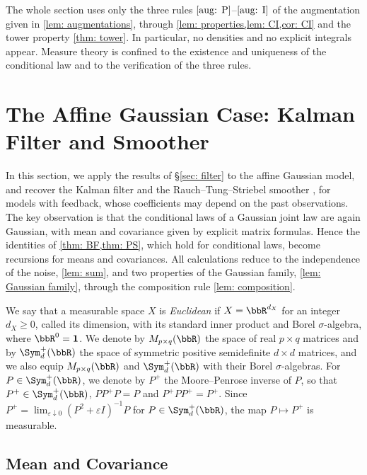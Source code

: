 \documentclass[12pt,reqno]{amsart}%
\theoremstyle{plain}
\theoremstyle{definition}
\def\ve{\varepsilon}
\def\R{\bbR}
\def\bsone{\boldsymbol{1}}
\begin{document}
\begin{remark}
	The whole section uses only the three rules $\ref{aug: P}$--$\ref{aug: I}$ of the augmentation
	given in \cref{lem: augmentations},
	through \cref{lem: properties,lem: CI,cor: CI} and the tower property \cref{thm: tower}.
	In particular, no densities and no explicit integrals appear. Measure theory is confined to
	the existence and uniqueness of the conditional law and to the verification of the three rules.
\end{remark}


%
%
%
\section{The Affine Gaussian Case: Kalman Filter and Smoother}\label{sec: Gaussian}
%
%
%

In this section, we apply the results of \S\ref{sec: filter} to the affine Gaussian model,
and recover the Kalman filter \cite{Kal60} and the Rauch--Tung--Striebel smoother \cite{RTS65},
for models with feedback, whose coefficients may depend on the past observations.
The key observation is that the conditional laws of a Gaussian joint law are again Gaussian,
with mean and covariance given by explicit matrix formulas.
Hence the identities of \cref{thm: BF,thm: PS}, which hold for conditional laws, become recursions for means and covariances.
All calculations reduce to the independence of the noise, \cref{lem: sum}, and two properties of the Gaussian family, \cref{lem: Gaussian family}, through the composition rule \cref{lem: composition}.

We say that a measurable space $X$ is \emph{Euclidean} if $X=\R^{d_X}$ for an integer $d_X\geq0$, called its dimension,
with its standard inner product and Borel $\sigma$-algebra, where $\R^0=\bsone$.
We denote by $M_{p\times q}(\R)$ the space of real $p\times q$ matrices and by $\Sym^+_d(\R)$ the space of
symmetric positive semidefinite $d\times d$ matrices,
and we also equip $M_{p\times q}(\R)$ and $\Sym^+_d(\R)$
with their Borel $\sigma$-algebras.
For $P\in\Sym^+_d(\R)$, we denote by $P^+$ the Moore--Penrose inverse of $P$, so that $P^+\in\Sym^+_d(\R)$,
$PP^+P=P$ and $P^+PP^+=P^+$.
Since $P^+=\lim_{\ve\downarrow0}(P^2+\ve I)^{-1}P$ for $P\in\Sym^+_d(\R)$, the map $P\mapsto P^+$ is measurable.

%
\subsection{Mean and Covariance}\label{sec: mean}
%
\end{document}
